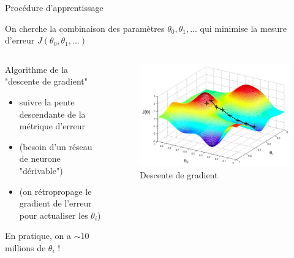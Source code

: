 \documentclass[9pt, aspectratio=169]{beamer}
\begin{document}
\begin{frame}{Procédure d'apprentissage} %

On cherche la combinaison des paramètres $\theta_0, \theta_1, ...$ qui minimise la mesure d'erreur $J(\theta_0, \theta_1, ...)$

\begin{columns}
    \begin{column}{0.48\textwidth}
Algorithme de la "descente de gradient" \cite{anderson_1986_1988}
	\begin{itemize}\small
		\item suivre la pente descendante de la métrique d'erreur
		\item (besoin d'un réseau de neurone "dérivable")
		\item (on rétropropage le gradient de l'erreur pour actualiser les $\theta_i$)
	\end{itemize}
En pratique, on a $\sim$10 millions de $\theta_i$ !

    \end{column}
    \begin{column}{0.48\textwidth}
    \begin{figure}
		\includegraphics[width=\textwidth]{fig/gradient_descent.jpg}
		\caption{Descente de gradient}
	\end{figure}
    \end{column}
\end{columns}

\end{frame}
\end{document}
